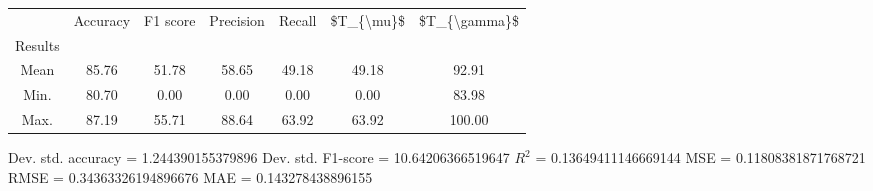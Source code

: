 \begin{tabular}{|c|c|c|c|c|c|c|}
\toprule
{} &  Accuracy &  F1 score &  Precision &  Recall &  \$T\_\{\textbackslash mu\}\$ &  \$T\_\{\textbackslash gamma\}\$ \\
Results &           &           &            &         &            &               \\
\hline
Mean    &     85.76 &     51.78 &      58.65 &   49.18 &      49.18 &         92.91 \\
Min.    &     80.70 &      0.00 &       0.00 &    0.00 &       0.00 &         83.98 \\
Max.    &     87.19 &     55.71 &      88.64 &   63.92 &      63.92 &        100.00 \\
\bottomrule
\end{tabular}

 Dev. std. accuracy = 1.244390155379896
 Dev. std. F1-score = 10.64206366519647
 $R^2$ = 0.13649411146669144
 MSE = 0.11808381871768721
 RMSE = 0.34363326194896676
 MAE = 0.143278438896155